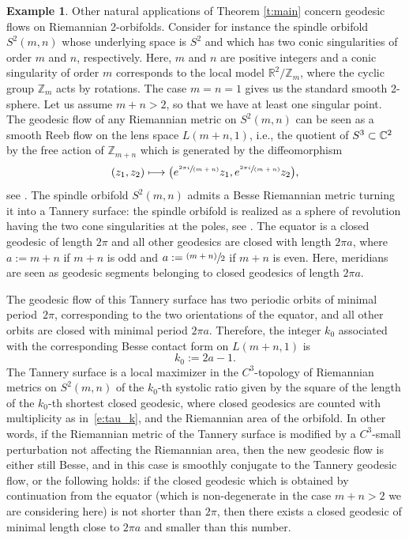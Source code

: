 \documentclass[11pt]{article}
\newcommand{\ie}{i.e.,\xspace}
\numberwithin{equation}{section}
\let\mathds\mathbb
\newcommand{\psfrac}[2]{\sfrac{(#1)}{#2}}
\newcommand{\spfrac}[2]{\sfrac{#1}{(#2)}}
\newcommand\mto{\mathchoice{\longmapsto}{\mapsto}{\mapsto}{\mapsto}}
\theoremstyle{definition}
\newtheorem{exm}[thm]{Example}
\newcommand{\Z}{\mathds{Z}}
\newcommand{\R}{\mathds{R}}
\begin{document}
\begin{exm}\label{exm:besse_spindle}
Other natural applications of Theorem \ref{t:main} concern geodesic flows on Riemannian 2-orbifolds. Consider for instance the spindle orbifold $S^2(m,n)$ whose underlying space is $S^2$ and which has two conic singularities of order $m$ and $n$, respectively. Here, $m$ and $n$ are positive integers and a conic singularity of order $m$ corresponds to the local model $\R^2/\Z_m$, where the cyclic group $\Z_m$ acts by rotations. The case $m=n=1$ gives us the standard smooth 2-sphere. Let us assume $m+n>2$, so that we have at least one singular point. The geodesic flow of any Riemannian metric on $S^2(m,n)$ can be seen as a smooth Reeb flow on the lens space $L(m+n,1)$, \ie the quotient of $S^3\subset \C^2$ by the free action of $\Z_{m+n}$ which is generated by the diffeomorphism
\[
(z_1,z_2) \mto \bigl( e^{\spfrac{2\pi i}{m+n}} z_1, e^{\spfrac{2\pi i}{m+n}} z_2 \bigr),
\]
see \cite{Lange:2020}. The spindle orbifold $S^2(m,n)$ admits a Besse Riemannian metric turning it into a Tannery surface: the spindle orbifold is realized as a sphere of revolution having the two cone singularities at the poles, see \cite[Chap.\,4]{Besse:1978pr}. The equator is a closed geodesic of length $2\pi$ and all other geodesics are closed with length $2\pi a$, where $a:= m+n$ if $m+n$ is odd and $a:= \psfrac{m+n}{2}$ if $m+n$ is even. Here, meridians are seen as geodesic segments belonging to closed geodesics of length $2\pi a$.

The geodesic flow of this Tannery surface has two periodic orbits of minimal period~$2\pi$, corresponding to the two orientations of the equator, and all other orbits are closed with minimal period $2\pi a$. Therefore, the integer $k_0$ associated with the corresponding Besse contact form on $L(m+n,1)$ is
\[
k_0 := 2a -1.
\]
The Tannery surface is a local maximizer in the $C^3$-topology of Riemannian metrics on $S^2(m,n)$ of the $k_0$-th systolic ratio given by the square of the length of the $k_0$\nobreakdash-th shortest closed geodesic, where closed geodesics are counted with multiplicity as in~\eqref{e:tau_k}, and the Riemannian area of the orbifold. In other words, if the Riemannian metric of the Tannery surface is modified by a $C^3$-small perturbation not affecting the Riemannian area, then the new geodesic flow is either still Besse, and in this case is smoothly conjugate to the Tannery geodesic flow, or the following holds: if the closed geodesic which is obtained by continuation from the equator (which is non-degenerate in the case $m+n>2$ we are considering here) is not shorter than $2\pi$, then there exists a closed geodesic of minimal length close to $2\pi a$ and smaller than this number.


\end{exm}
\end{document}
